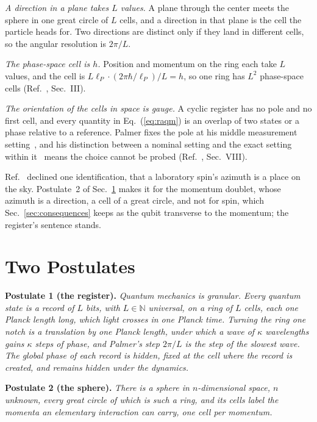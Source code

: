 \documentclass[aps,prd,twocolumn,superscriptaddress,nofootinbib]{revtex4-2}
\begin{document}
\textit{A direction in a plane takes $L$ values.} A plane through the center meets the sphere in one great circle of $L$ cells, and a direction in that plane is the cell the particle heads for. Two directions are distinct only if they land in different cells, so the angular resolution is $2\pi/L$.

\textit{The phase-space cell is $h$.} Position and momentum on the ring each take $L$ values, and the cell is $L\ell_P\cdot(2\pi\hbar/\ell_P)/L = h$, so one ring has $L^2$ phase-space cells (Ref.~\cite{korytko2026c}, Sec.~III).

\textit{The orientation of the cells in space is gauge.} A cyclic register has no pole and no first cell, and every quantity in Eq.~(\ref{eq:raqm}) is an overlap of two states or a phase relative to a reference. Palmer fixes the pole at his middle measurement setting~\cite{palmer2026c}, and his distinction between a nominal setting and the exact setting within it~\cite{palmer2024} means the choice cannot be probed (Ref.~\cite{korytko2026c}, Sec.~VIII).

Ref.~\cite{korytko2026c} declined one identification, that a laboratory spin's azimuth is a place on the sky. Postulate~2 of Sec.~\ref{sec:postulates} makes it for the momentum doublet, whose azimuth is a direction, a cell of a great circle, and not for spin, which Sec.~\ref{sec:consequences} keeps as the qubit transverse to the momentum; the register's sentence stands.

\section{Two Postulates}
\label{sec:postulates}

\textbf{Postulate 1 (the register).} \emph{Quantum mechanics is granular. Every quantum state is a record of $L$ bits, with $L\in\mathbb{N}$ universal, on a ring of $L$ cells, each one Planck length long, which light crosses in one Planck time. Turning the ring one notch is a translation by one Planck length, under which a wave of $\kappa$ wavelengths gains $\kappa$ steps of phase, and Palmer's step $2\pi/L$ is the step of the slowest wave. The global phase of each record is hidden, fixed at the cell where the record is created, and remains hidden under the dynamics.}

\textbf{Postulate 2 (the sphere).} \emph{There is a sphere in $n$-dimensional space, $n$ unknown, every great circle of which is such a ring, and its cells label the momenta an elementary interaction can carry, one cell per momentum.}
\end{document}
